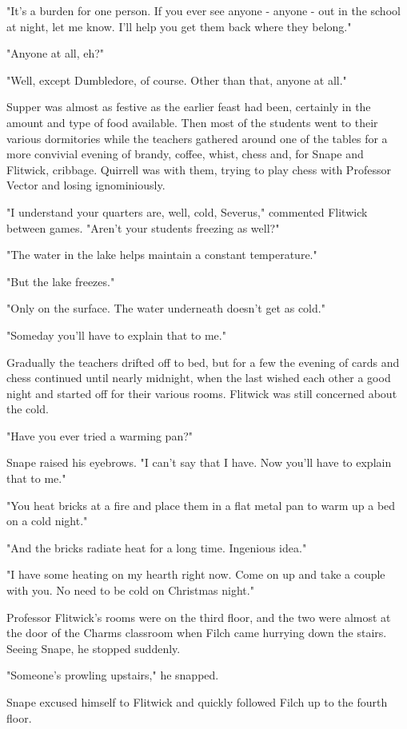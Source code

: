 \documentclass[a4paper,11pt]{article}
\begin{document}
"It's a burden for one person. If you ever see anyone - anyone - out in the school at night, let me know. I'll help you get them back where they belong."

"Anyone at all, eh?"

"Well, except Dumbledore, of course. Other than that, anyone at all."

Supper was almost as festive as the earlier feast had been, certainly in the amount and type of food available. Then most of the students went to their various dormitories while the teachers gathered around one of the tables for a more convivial evening of brandy, coffee, whist, chess and, for Snape and Flitwick, cribbage. Quirrell was with them, trying to play chess with Professor Vector and losing ignominiously.

"I understand your quarters are, well, cold, Severus," commented Flitwick between games. "Aren't your students freezing as well?"

"The water in the lake helps maintain a constant temperature."

"But the lake freezes."

"Only on the surface. The water underneath doesn't get as cold."

"Someday you'll have to explain that to me."

Gradually the teachers drifted off to bed, but for a few the evening of cards and chess continued until nearly midnight, when the last wished each other a good night and started off for their various rooms. Flitwick was still concerned about the cold.

"Have you ever tried a warming pan?"

Snape raised his eyebrows. "I can't say that I have. Now you'll have to explain that to me."

"You heat bricks at a fire and place them in a flat metal pan to warm up a bed on a cold night."

"And the bricks radiate heat for a long time. Ingenious idea."

"I have some heating on my hearth right now. Come on up and take a couple with you. No need to be cold on Christmas night."

Professor Flitwick's rooms were on the third floor, and the two were almost at the door of the Charms classroom when Filch came hurrying down the stairs. Seeing Snape, he stopped suddenly.

"Someone's prowling upstairs," he snapped.

Snape excused himself to Flitwick and quickly followed Filch up to the fourth floor.
\end{document}
